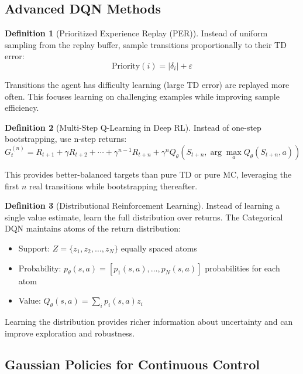 \documentclass[12pt,a4paper]{article}
\theoremstyle{definition}
\newtheorem{definition}{Definition}[section]
\begin{document}
\subsection{Advanced DQN Methods}

\begin{definition}[Prioritized Experience Replay (PER)]
Instead of uniform sampling from the replay buffer, sample transitions proportionally to their TD error:
\[
\text{Priority}(i) = |\delta_i| + \varepsilon
\]

Transitions the agent has difficulty learning (large TD error) are replayed more often. This focuses learning on challenging examples while improving sample efficiency.
\end{definition}

\begin{definition}[Multi-Step Q-Learning in Deep RL]
Instead of one-step bootstrapping, use n-step returns:
\[
G_t^{(n)} = R_{t+1} + \gamma R_{t+2} + \cdots + \gamma^{n-1} R_{t+n} + \gamma^n Q_\theta(S_{t+n}, \arg\max_a Q_\theta(S_{t+n}, a))
\]

This provides better-balanced targets than pure TD or pure MC, leveraging the first $n$ real transitions while bootstrapping thereafter.
\end{definition}

\begin{definition}[Distributional Reinforcement Learning]
Instead of learning a single value estimate, learn the full distribution over returns. The Categorical DQN maintains atoms of the return distribution:

\begin{itemize}
    \item Support: $Z = \{z_1, z_2, \ldots, z_N\}$ equally spaced atoms
    \item Probability: $p_\theta(s, a) = [p_1(s, a), \ldots, p_N(s, a)]$ probabilities for each atom
    \item Value: $Q_\theta(s, a) = \sum_i p_i(s, a) z_i$
\end{itemize}

Learning the distribution provides richer information about uncertainty and can improve exploration and robustness.
\end{definition}

\subsection{Gaussian Policies for Continuous Control}
\end{document}

